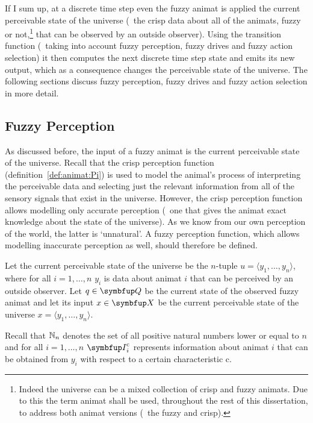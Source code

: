 If I sum up, at a discrete time step even the fuzzy animat is applied the current perceivable state of the universe (\ie\ the crisp data about all of the animats, fuzzy or not,\footnote{Indeed the universe can be a mixed collection of crisp and fuzzy animats. Due to this the term animat shall be used, throughout the rest of this dissertation, to address both animat versions (\ie\ the fuzzy and crisp).} that can be observed by an outside observer). Using the transition function (\ie\ taking into account fuzzy perception, fuzzy drives and fuzzy action selection) it then computes the next discrete time step state and emits its new output, which as a consequence changes the perceivable state of the universe. The following sections discuss fuzzy perception, fuzzy drives and fuzzy action selection in more detail.

\subsection{Fuzzy Perception}
As discussed before, the input of a fuzzy animat is the current perceivable state of the universe. Recall that the crisp perception function (definition~\ref{def:animat:Pi}) is used to model the animal's process of interpreting the perceivable data and selecting just the relevant information from all of the sensory signals that exist in the universe. However, the crisp perception function allows modelling only accurate perception (\ie\ one that gives the animat exact knowledge about the state of the universe). As we know from our own perception of the world, the latter is `unnatural'. A fuzzy perception function, which allows modelling inaccurate perception as well, should therefore be defined.

Let the current perceivable state of the universe be the $n$-tuple $u=\langle y_1,\ldots,y_n \rangle$, where for all $i=1,\ldots,n$ $y_i$ is data about animat $i$ that can be perceived by an outside observer. Let $q \in \set{Q}$ be the current state of the observed fuzzy animat and let its input $x \in \set{X}$ be the current perceivable state of the universe $x=\langle y_1,\ldots,y_n \rangle$.

Recall that $\mathbb{N}_n$ denotes the set of all positive natural numbers lower or equal to $n$ and for all $i=1,\ldots,n$ $\set{I}^\textnormal{c}_i$ represents information about animat $i$ that can be obtained from $y_i$ with respect to a certain characteristic $\mathrm{c}$.

